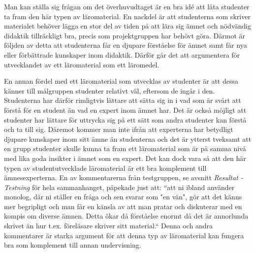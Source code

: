 \documentclass[]{article}
\begin{document}
Man kan ställa sig frågan om det överhuvudtaget är en bra idé att
låta studenter ta fram den här typen av läromaterial. En nackdel
är att studenterna som skriver materialet behöver lägga en stor
del av tiden på att lära sig ämnet och nödvändig didaktik
tillräckligt bra, precis som projektgruppen har behövt göra.
Därmot är följden av detta att studenterna
får en djupare förståelse för ämnet samt får nya
eller förbättrade kunskaper inom didaktik.
Därför går det att argumentera för utvecklandet av ett läromaterial
som ett läromedel.

En annan fördel med ett läromaterial som utvecklas av studenter
är att dessa känner till målgruppen studenter relativt väl,
eftersom de ingår i den. Studenterna har därför rimligtvis lättare
att sätta sig in i vad som är svårt att förstå för en student
än vad en expert inom ämnet har. Det är också möjligt att studenter
har lättare för uttrycka sig på ett sätt som andra studenter
kan förstå och ta till sig. Däremot kommer man inte ifrån
att experterna har betydligt djupare kunskaper inom sitt ämne
än studenterna och det är ytterst tveksamt att en grupp studenter
skulle kunna ta fram ett läromaterial som är på samma nivå med
lika goda insikter i ämnet som en expert. Det kan dock vara så
att den här typen av studentutvecklade läromaterial är ett bra
komplement till ämnesexperterna. En av kommentarerna från
testgruppen, se avsnitt \textit{Resultat - Testning} för hela sammanhanget,
påpekade just att: “att ni ibland använder monolog, där ni
ställer en fråga och sen svarar som "en vän", gör
att det känns mer begripligt och man får en känsla av att man
pratar och diskuterar med en kompis om diverse ämnen. Detta
ökar då förståelse enormt då det är annorlunda skrivet än hur
t.ex. föreläsare skriver sitt material.“ Denna och andra
kommentarer är starka argument för att denna typ av
läromaterial kan fungera bra som komplement till annan
undervisning.


\end{document}
